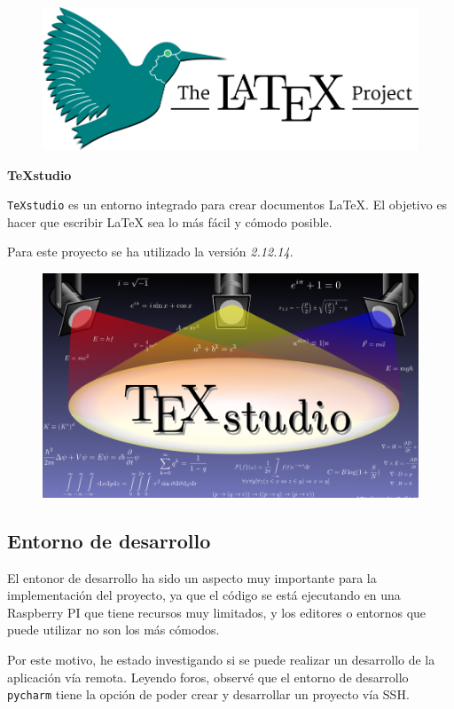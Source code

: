 \begin{figure}[h]
	\centering
	\includegraphics[scale=0.18]{images/16}
\end{figure}

\textbf{TeXstudio}

\texttt{TeXstudio} \cite{ref21} es un entorno integrado para crear documentos LaTeX. El objetivo es hacer que escribir LaTeX sea lo más fácil y cómodo posible.

Para este proyecto se ha utilizado la versión \textit{2.12.14}.

\begin{figure}[h]
	\centering
	\includegraphics[scale=0.3]{images/17}
\end{figure}

\subsection{Entorno de desarrollo}

El entonor de desarrollo ha sido un aspecto muy importante para la implementación del proyecto, ya que el código se está ejecutando en una Raspberry PI que tiene recursos muy limitados, y los editores o entornos que puede utilizar no son los más cómodos.

Por este motivo, he estado investigando si se puede realizar un desarrollo de la aplicación vía remota. Leyendo foros, observé que el entorno de desarrollo \texttt{pycharm} tiene la opción de poder crear y desarrollar un proyecto vía SSH.

